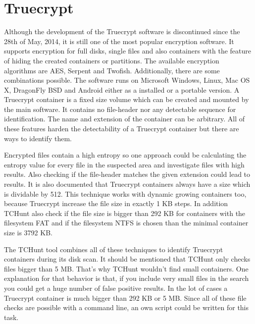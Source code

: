 \section{Truecrypt}
Although the development of the Truecrypt software is discontinued since the 28th of May, 2014, it is still one of the most popular encryption software.
It supports encryption for full disks, single files and also containers with the feature of hiding the created containers or partitions.
The available encryption algorithms are AES, Serpent and Twofish. Additionally, there are some combinations possible.
The software runs on Microsoft Windows, Linux, Mac OS X, DragonFly BSD and Android either as a installed or a portable version.\cite{wiki:truecrypt}
A Truecrypt container is a fixed size volume which can be created and mounted by the main software.
It contains no file-header nor any detectable sequence for identification.
The name and extension of the container can be arbitrary.
All of these features harden the detectability of a Truecrypt container but there are ways to identify them.

Encrypted files contain a high entropy so one approach could be calculating the entropy value for every file in the suspected area and investigate files with high results.
Also checking if the file-header matches the given extension could lead to results.
It is also documented that Truecrypt containers always have a size which is dividable by 512.
This technique works with dynamic growing containers too, because Truecrypt increase the file size in exactly 1 KB steps. In addition TCHunt also check if the file size is bigger than 292 KB for containers with the filesystem FAT and if the filesystem NTFS is chosen than the minimal container size is 3792 KB.
\cite{truecrypt:sourceCode}

The TCHunt tool combines all of these techniques to identify Truecrypt containers during its disk scan. It should be mentioned that TCHunt only checks files bigger than 5 MB.
That's why TCHunt wouldn't find small containers. One explanation for that behavior is that, if you include very small files in the search you could get a huge number of false positive results. In the lot of cases a Truecrypt container is much bigger than 292 KB or 5 MB. 
Since all of these file checks are possible with a command line, an own script could be written for this task.
